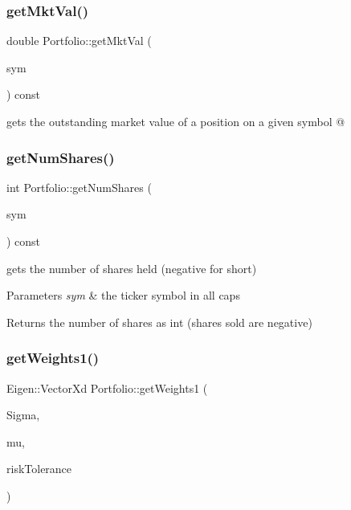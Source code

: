 \subsubsection{\texorpdfstring{get\+Mkt\+Val()}{getMktVal()}}
{\footnotesize\ttfamily double Portfolio\+::get\+Mkt\+Val (\begin{DoxyParamCaption}\item[{const std\+::string \&}]{sym }\end{DoxyParamCaption}) const}



gets the outstanding market value of a position on a given symbol @ 

\mbox{\label{classPortfolio_a4362d4cfc98f8cf060e611a74b91673a}} 
\subsubsection{\texorpdfstring{get\+Num\+Shares()}{getNumShares()}}
{\footnotesize\ttfamily int Portfolio\+::get\+Num\+Shares (\begin{DoxyParamCaption}\item[{const std\+::string \&}]{sym }\end{DoxyParamCaption}) const}



gets the number of shares held (negative for short) 


\begin{DoxyParams}{Parameters}
{\em sym} & the ticker symbol in all caps \\
\hline
\end{DoxyParams}
\begin{DoxyReturn}{Returns}
the number of shares as int (shares sold are negative) 
\end{DoxyReturn}
\mbox{\label{classPortfolio_a7a932e1e5b68e8fc8b91d16287f6de30}} 
\subsubsection{\texorpdfstring{get\+Weights1()}{getWeights1()}}
{\footnotesize\ttfamily Eigen\+::\+Vector\+Xd Portfolio\+::get\+Weights1 (\begin{DoxyParamCaption}\item[{const Eigen\+::\+Matrix\+Xd \&}]{Sigma,  }\item[{const Eigen\+::\+Vector\+Xd \&}]{mu,  }\item[{const double \&}]{risk\+Tolerance }\end{DoxyParamCaption})}



